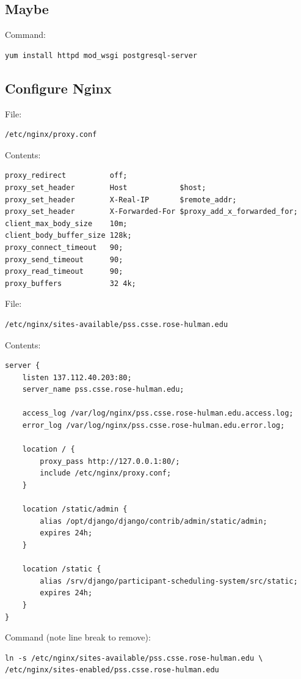 \documentclass{article}
\begin{document}
\subsection{Maybe}

Command:
\begin{verbatim}
yum install httpd mod_wsgi postgresql-server
\end{verbatim}

\subsection{Configure Nginx}

File:
\begin{verbatim}
/etc/nginx/proxy.conf
\end{verbatim}

Contents:
\begin{verbatim}
proxy_redirect          off;
proxy_set_header        Host            $host;
proxy_set_header        X-Real-IP       $remote_addr;
proxy_set_header        X-Forwarded-For $proxy_add_x_forwarded_for;
client_max_body_size    10m;
client_body_buffer_size 128k;
proxy_connect_timeout   90;
proxy_send_timeout      90;
proxy_read_timeout      90;
proxy_buffers           32 4k;
\end{verbatim}

File:
\begin{verbatim}
/etc/nginx/sites-available/pss.csse.rose-hulman.edu
\end{verbatim}

Contents:
\begin{verbatim}
server {
    listen 137.112.40.203:80;
    server_name pss.csse.rose-hulman.edu;

    access_log /var/log/nginx/pss.csse.rose-hulman.edu.access.log;
    error_log /var/log/nginx/pss.csse.rose-hulman.edu.error.log;

    location / {
        proxy_pass http://127.0.0.1:80/;
        include /etc/nginx/proxy.conf;
    }

    location /static/admin {
        alias /opt/django/django/contrib/admin/static/admin;
        expires 24h;
    }

    location /static {
        alias /srv/django/participant-scheduling-system/src/static;
        expires 24h;
    }
}
\end{verbatim}

Command (note line break to remove):
\begin{verbatim}
ln -s /etc/nginx/sites-available/pss.csse.rose-hulman.edu \
/etc/nginx/sites-enabled/pss.csse.rose-hulman.edu
\end{verbatim}
\end{document}

